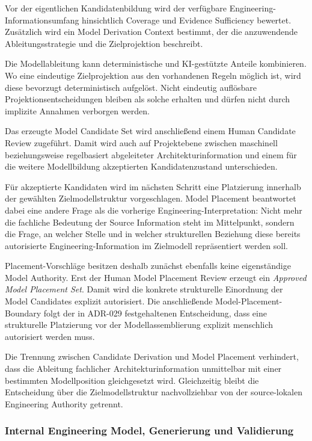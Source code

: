 Vor der eigentlichen Kandidatenbildung wird der verfügbare
Engineering-Informationsumfang hinsichtlich Coverage und Evidence Sufficiency
bewertet. Zusätzlich wird ein Model Derivation Context bestimmt, der die
anzuwendende Ableitungsstrategie und die Zielprojektion beschreibt.

Die Modellableitung kann deterministische und KI-gestützte Anteile kombinieren.
Wo eine eindeutige Zielprojektion aus den vorhandenen Regeln möglich ist, wird
diese bevorzugt deterministisch aufgelöst. Nicht eindeutig auflösbare
Projektionsentscheidungen bleiben als solche erhalten und dürfen nicht durch
implizite Annahmen verborgen werden.

Das erzeugte Model Candidate Set wird anschließend einem Human Candidate Review
zugeführt. Damit wird auch auf Projektebene zwischen maschinell beziehungsweise
regelbasiert abgeleiteter Architekturinformation und einem für die weitere
Modellbildung akzeptierten Kandidatenzustand unterschieden.

Für akzeptierte Kandidaten wird im nächsten Schritt eine Platzierung innerhalb
der gewählten Zielmodellstruktur vorgeschlagen. Model Placement beantwortet
dabei eine andere Frage als die vorherige Engineering-Interpretation:
Nicht mehr die fachliche Bedeutung der Source Information steht im Mittelpunkt,
sondern die Frage, an welcher Stelle und in welcher strukturellen Beziehung
diese bereits autorisierte Engineering-Information im Zielmodell repräsentiert
werden soll.

Placement-Vorschläge besitzen deshalb zunächst ebenfalls keine eigenständige
Model Authority. Erst der Human Model Placement Review erzeugt ein
\emph{Approved Model Placement Set}. Damit wird die konkrete strukturelle
Einordnung der Model Candidates explizit autorisiert. Die anschließende Model-Placement-Boundary folgt der in ADR-029 festgehaltenen
Entscheidung, dass eine strukturelle Platzierung vor der Modellassemblierung
explizit menschlich autorisiert werden muss.

Die Trennung zwischen Candidate Derivation und Model Placement verhindert,
dass die Ableitung fachlicher Architekturinformation unmittelbar mit einer
bestimmten Modellposition gleichgesetzt wird. Gleichzeitig bleibt die
Entscheidung über die Zielmodellstruktur nachvollziehbar von der
source-lokalen Engineering Authority getrennt.


\subsubsection{Internal Engineering Model, Generierung und Validierung}
\label{sec:iem_generation_validation}

